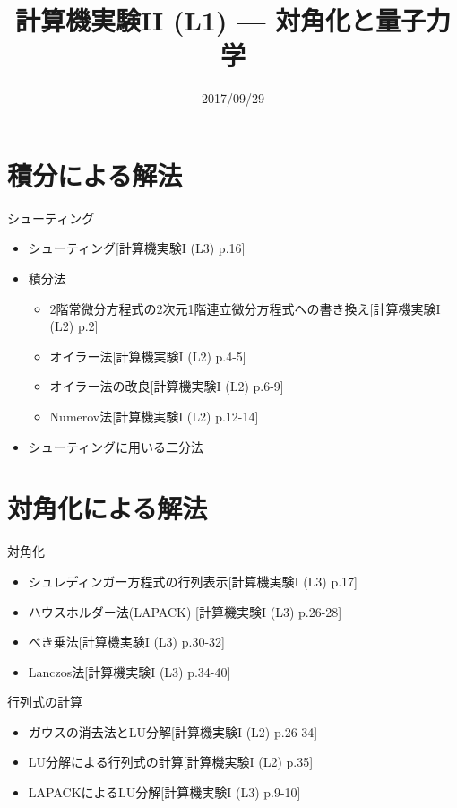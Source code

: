 \documentclass[dvipdfmx]{beamer}
\title{計算機実験II (L1) --- 対角化と量子力学}
\date{2017/09/29}
\begin{document}
\begin{frame}
  \titlepage
  \tableofcontents
\end{frame}




\section{積分による解法}

\begin{frame}[t,fragile]{シューティング}
  \begin{itemize}
    \setlength{\itemsep}{1em}
  \item シューティング[計算機実験I (L3) p.16]
  \item 積分法
    \begin{itemize}
    \item 2階常微分方程式の2次元1階連立微分方程式への書き換え[計算機実験I (L2) p.2]
    \item オイラー法[計算機実験I (L2) p.4-5]
    \item オイラー法の改良[計算機実験I (L2) p.6-9]
    \item Numerov法[計算機実験I (L2) p.12-14]
    \end{itemize}
  \item シューティングに用いる二分法
  \end{itemize}
\end{frame}



\section{対角化による解法}

\begin{frame}[t,fragile]{対角化}
  \begin{itemize}
    \setlength{\itemsep}{1em}
  \item シュレディンガー方程式の行列表示[計算機実験I (L3) p.17]
  \item ハウスホルダー法(LAPACK) [計算機実験I (L3) p.26-28]
  \item べき乗法[計算機実験I (L3) p.30-32]
  \item Lanczos法[計算機実験I (L3) p.34-40]
  \end{itemize}
\end{frame}



\begin{frame}[t,fragile]{行列式の計算}
  \begin{itemize}
    \setlength{\itemsep}{1em}
  \item ガウスの消去法とLU分解[計算機実験I (L2) p.26-34]
  \item LU分解による行列式の計算[計算機実験I (L2) p.35]
  \item LAPACKによるLU分解[計算機実験I (L3) p.9-10]
  \end{itemize}
\end{frame}
\end{document}

